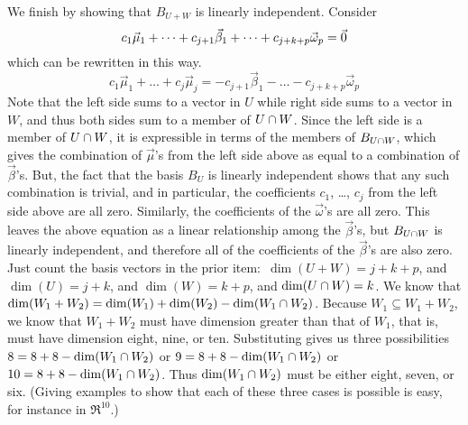 \begin{exercises}
\begin{answer}
\begin{exparts}
         We finish by showing that $B_{U+W}$ is linearly independent. 
         Consider
         \begin{equation*}
           c_1\vec{\mu}_1+\dots+c_{j+1}\vec{\beta}_1+\dots
              +c_{j+k+p}\vec{\omega}_p=\vec{0}
         \end{equation*}
         which can be rewritten in this way.
         \begin{equation*}
           c_1\vec{\mu}_1+\dots+c_j\vec{\mu}_j=
             -c_{j+1}\vec{\beta}_1-\dots-c_{j+k+p}\vec{\omega}_p
         \end{equation*}
         Note that the left side sums to a vector in \( U \) while 
         right side sums to a vector in \( W \), and thus both sides sum to
         a member of $U\cap W$.
         Since the left side is a member of $U\cap W$, 
         it is expressible in terms of the members of $B_{U\cap W}$, 
         which gives the combination of $\vec{\mu}$'s from the left side above
         as equal to a combination of $\vec{\beta}$'s. 
         But, the fact that 
         the basis $B_U$ is linearly independent shows 
         that any such combination
         is trivial, and in particular, the coefficients $c_1$, \ldots,
         $c_j$ from the left side above are all zero.
         Similarly, the coefficients of the \( \vec{\omega} \)'s are all zero.
         This leaves the above equation as a linear relationship among the 
         \( \vec{\beta} \)'s, 
         but $B_{U\cap W}$ is linearly independent, 
         and therefore all of the coefficients of the $\vec{\beta}$'s are also
         zero.
        \partsitem Just count the basis vectors in the prior 
          item:~$\dim(U+W)=j+k+p$, and $\dim(U)=j+k$, and $\dim(W)=k+p$, 
          and $\dim(U\cap W)=k$.
        \partsitem  We know that
          \( \dim(W_1+W_2)=\dim(W_1)+\dim(W_2)-\dim(W_1\cap W_2) \).
          Because \( W_1\subseteq W_1+W_2 \), 
          we know that \( W_1+W_2 \) must have dimension greater than that of
          $W_1$, that is, must have dimension eight, nine, or ten.
          Substituting gives us three possibilities
          $8=8+8-\dim(W_1\cap W_2)$ or
          $9=8+8-\dim(W_1\cap W_2)$ or
          $10=8+8-\dim(W_1\cap W_2)$.
          Thus \( \dim(W_1\cap W_2) \) must be either 
          eight, seven, or six.
          (Giving examples to show that 
          each of these three cases is possible
          is easy, for instance in \( \Re^{10} \).)  
      \end{exparts}

\end{answer}
\end{exercises}
